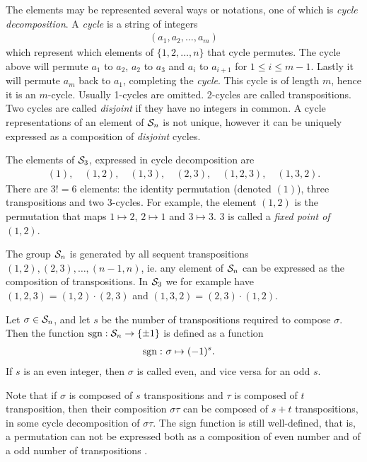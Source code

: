 The elements may be represented several ways or notations, one of which is \textit{cycle decomposition}. A \textit{cycle} is a string of integers \begin{align*}
	(a_1, a_2, \dots, a_m)
\end{align*} which represent which elements of $\{1,2, \dots, n\}$ that cycle permutes. The cycle above will permute $a_1$ to $a_2$, $a_2$ to $a_3$ and $a_{i}$ to $a_{i+1}$ for $1 \leq i \leq m-1$. Lastly it will permute $a_m$ back to $a_1$, completing the \textit{cycle}. This cycle is of length $m$, hence it is an $m$-cycle. Usually 1-cycles are omitted. 2-cycles are called transpositions. Two cycles are called \textit{disjoint} if they have no integers in common. A cycle representations of an element of $\mathcal{S}_n$ is not unique, however it can be uniquely expressed as a composition of \textit{disjoint} cycles.

\begin{example}
	The elements of $\mathcal{S}_3$, expressed in cycle decomposition are
	\begin{align*}
		(1),\quad (1,2), \quad(1,3), \quad(2,3), \quad(1,2,3), \quad(1,3,2).
	\end{align*}
	There are $3! = 6$ elements: the identity permutation (denoted $(1)$), three transpositions and two 3-cycles. For example, the element $(1,2)$ is the permutation that maps $1 \mapsto 2$, $2 \mapsto 1$ and $3 \mapsto 3$. 3 is called a \textit{fixed point of $(1,2)$}.
\end{example}

\begin{note}
	The group $\mathcal{S}_n$ is generated by all sequent transpositions $(1,2), (2,3), \dots, (n-1,n)$, ie. any element of $\mathcal{S}_n$ can be expressed as the composition of transpositions. In $\mathcal{S}_3$ we for example have $(1,2,3) = (1,2)\cdot(2,3)$ and $(1,3,2) = (2,3)\cdot(1,2)$.
\end{note}

\begin{definition}
	Let $\sigma \in \mathcal{S}_n$, and let $s$ be the number of transpositions required to compose $\sigma$. Then the function $\text{sgn}: \mathcal{S}_n \rightarrow \{\pm 1\}$ is defined as a function
	\begin{align*}
		\text{sgn}: & \ \sigma \mapsto (-1)^s.
	\end{align*}
	If $s$ is an even integer, then $\sigma$ is called even, and vice versa for an odd $s$.
\end{definition}

Note that if $\sigma$ is composed of $s$ transpositions and $\tau$ is composed of $t$ transposition, then their composition $\sigma\tau$ can be composed of $s+t$ transpositions, in some cycle decomposition of $\sigma\tau$. The sign function is still well-defined, that is, a permutation can not be expressed both as a composition of even number and of a odd number of transpositions \cite[Thm.12.6.1.]{Biggs}.

